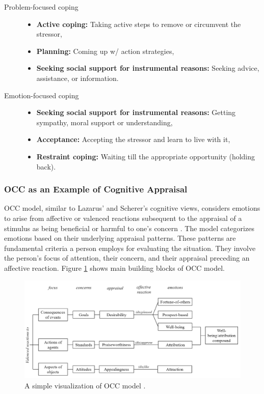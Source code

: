 \documentclass[11pt]{article}
\begin{document}
\begin{description}
  \item[Problem-focused coping] \hfill
	\begin{itemize}
	  \item \textbf{Active coping:} Taking active steps to remove or circumvent the
	  stressor,
	  \item \textbf{Planning:} Coming up w/ action strategies,
	  \item \textbf{Seeking social support for instrumental reasons:} Seeking
	  advice, assistance, or information.
	\end{itemize}
  \item[Emotion-focused coping] \hfill
    \begin{itemize}
	  \item \textbf{Seeking social support for instrumental reasons:} Getting
	  sympathy, moral support or understanding,
	  \item \textbf{Acceptance:} Accepting the stressor and learn to live with it,
	  \item \textbf{Restraint coping:} Waiting till the appropriate opportunity
	  (holding back).
	\end{itemize}
\end{description}

\subsubsection{OCC as an Example of Cognitive Appraisal}

OCC model, similar to Lazarus' \cite{lazarus:cognitive-theory-emotion} and
Scherer's \cite{scherer:nature-function-emotion} cognitive views, considers
emotions to arise from affective or valenced reactions subsequent to the
appraisal of a stimulus as being beneficial or harmful to one’s concern
\cite{occ:structure}. The model categorizes emotions based on their underlying
appraisal patterns. These patterns are fundamental criteria a person employs for
evaluating the situation. They involve the person’s focus of attention, their
concern, and their appraisal preceding an affective reaction. Figure
\ref{fig:occ-model} shows main building blocks of OCC model.

\begin{figure}[tbh]
  \center
  \includegraphics[width=\textwidth]{figure/occ.png}
  \caption{A simple visualization of OCC model \cite{occ:structure}.}
  \label{fig:occ-model}
\end{figure}
\end{document}
